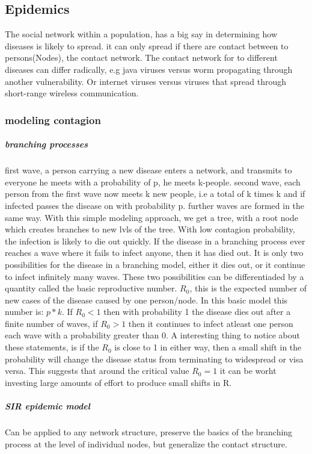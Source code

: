  \subsection{Epidemics}
 \cite{easley2012networks}
 The social network within a population, has a big say in determining how diseases is likely to
  spread. it can only spread if there are contact between to persons(Nodes), the contact network.
  The contact network for to different diseases can differ radically, e.g java viruses versus worm
   propagating through another vulnerability. Or internet viruses versus viruses that spread through short-range wireless communication. 
   \subsubsection{modeling contagion}
   \subparagraph{branching processes}
   first wave, a person carrying a new disease enters a network, and transmits to everyone he meets with a probability of p, he meets k-people.
second wave, each person from the first wave now meets k new people, i.e a total of k times k and if infected passes the disease on with probability p.
further waves are formed in the same way.
With this simple modeling approach, we get a tree, with a root node which creates branches to new
lvls of the tree. With low contagion probability, the infection is likely to die out quickly. 
If the disease in a branching process ever reaches a wave where it fails to infect anyone, then it has died out. It is only two possibilities for the disease in a branching model, 
either it dies out, or it continue to infect infinitely  many waves. These two possibilities can be
 differentiaded by a quantity called the basic reproductive number.  $R_{0}$, this is the expected
  number of new cases of the disease caused by one person/node. In this basic model this number is:
   $p*k$. If $R_{0}<1$ then with probability 1 the disease dies out after a finite number of waves, if $R_{0}>1$ then it continues to infect atleast one person each wave with a probability greater than 0.
   A interesting thing to notice about these statements, is if the $R_{0}$ is close to 1 in 
   either way, then a small shift in the probability will change the 
   disease status from terminating to widespread or visa versa. This suggests that around the critical value $R_{0}=1 $ it can be worht investing large amounts of effort to produce small shifts in R. 
\subparagraph{SIR epidemic model}
Can be applied to any network structure, preserve the basics of the branching process at the level of individual nodes, but generalize the contact structure. 
